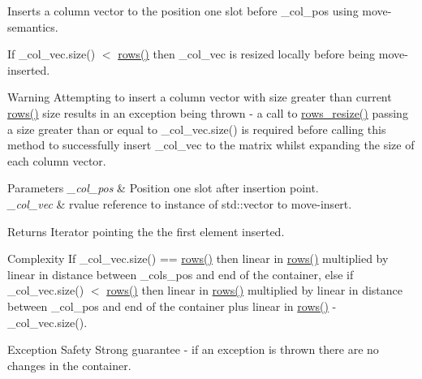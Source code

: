 Inserts a column vector to the position one slot before {\ttfamily \+\_\+col\+\_\+pos} using move-\/semantics. 

If {\ttfamily \+\_\+col\+\_\+vec.\+size() $<$ \hyperlink{classcrsc_1_1dynamic__matrix_a5d167a31d3be0ac09d3abdf57a11832d}{rows()}} then {\ttfamily \+\_\+col\+\_\+vec} is resized locally before being move-\/inserted.

\begin{DoxyWarning}{Warning}
Attempting to insert a column vector with size greater than current {\ttfamily \hyperlink{classcrsc_1_1dynamic__matrix_a5d167a31d3be0ac09d3abdf57a11832d}{rows()}} size results in an exception being thrown -\/ a call to \hyperlink{classcrsc_1_1dynamic__matrix_a7a3ec3787c143699681fffa278d0ba4f}{rows\+\_\+resize()} passing a size greater than or equal to {\ttfamily \+\_\+col\+\_\+vec.\+size()} is required before calling this method to successfully insert {\ttfamily \+\_\+col\+\_\+vec} to the matrix whilst expanding the size of each column vector. 
\end{DoxyWarning}

\begin{DoxyParams}{Parameters}
{\em \+\_\+col\+\_\+pos} & Position one slot after insertion point. \\
\hline
{\em \+\_\+col\+\_\+vec} & rvalue reference to instance of {\ttfamily std\+::vector} to move-\/insert. \\
\hline
\end{DoxyParams}
\begin{DoxyReturn}{Returns}
Iterator pointing the the first element inserted. 
\end{DoxyReturn}
\begin{DoxyParagraph}{Complexity}
If {\ttfamily \+\_\+col\+\_\+vec.\+size() == \hyperlink{classcrsc_1_1dynamic__matrix_a5d167a31d3be0ac09d3abdf57a11832d}{rows()}} then linear in {\ttfamily \hyperlink{classcrsc_1_1dynamic__matrix_a5d167a31d3be0ac09d3abdf57a11832d}{rows()}} multiplied by linear in distance between {\ttfamily \+\_\+cols\+\_\+pos} and {\ttfamily end} of the container, else if {\ttfamily \+\_\+col\+\_\+vec.\+size() $<$ \hyperlink{classcrsc_1_1dynamic__matrix_a5d167a31d3be0ac09d3abdf57a11832d}{rows()}} then linear in {\ttfamily \hyperlink{classcrsc_1_1dynamic__matrix_a5d167a31d3be0ac09d3abdf57a11832d}{rows()}} multiplied by linear in distance between {\ttfamily \+\_\+col\+\_\+pos} and {\ttfamily end} of the container plus linear in {\ttfamily \hyperlink{classcrsc_1_1dynamic__matrix_a5d167a31d3be0ac09d3abdf57a11832d}{rows()} -\/ \+\_\+col\+\_\+vec.\+size()}. 
\end{DoxyParagraph}
\begin{DoxyParagraph}{Exception Safety}
Strong guarantee -\/ if an exception is thrown there are no changes in the container. 
\end{DoxyParagraph}
